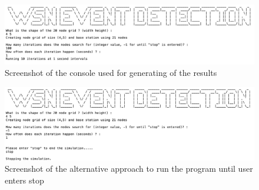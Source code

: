\documentclass[conference]{IEEEtran}
\begin{document}
	
\begin{figure}[h]
	\centering
	\includegraphics[width=6in,keepaspectratio]{console1}
	\caption{Screenshot of the console used for generating of the results}
	\label{screen 1}
\end{figure}

\begin{figure}[h]
	\centering
	\includegraphics[width=6in,keepaspectratio]{console2}
	\caption{Screenshot of the alternative approach to run the program until user enters stop}
	\label{screen 2}
\end{figure}
\end{document}
